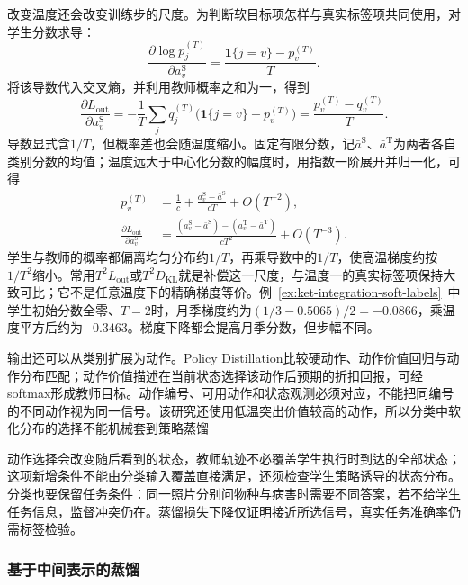 改变温度还会改变训练步的尺度。为判断软目标项怎样与真实标签项共同使用，对学生分数求导：
\[
  \frac{\partial\log p_j^{(T)}}{\partial a_v^{\mathrm{S}}}
    =\frac{\mathbf{1}\{j=v\}-p_v^{(T)}}{T}.
\]
将该导数代入交叉熵，并利用教师概率之和为一，得到
\begin{equation}
  \frac{\partial L_{\mathrm{out}}}{\partial a_v^{\mathrm{S}}}
   =-\frac{1}{T}\sum_jq_j^{(T)}
      \bigl(\mathbf{1}\{j=v\}-p_v^{(T)}\bigr)
   =\frac{p_v^{(T)}-q_v^{(T)}}{T}.
  \label{eq:ket-integration-temperature-gradient}
\end{equation}
导数显式含$1/T$，但概率差也会随温度缩小。固定有限分数，记$\bar a^{\mathrm{S}}$、$\bar a^{\mathrm{T}}$为两者各自类别分数的均值；温度远大于中心化分数的幅度时，用指数一阶展开并归一化，可得
\begin{equation}
  \begin{aligned}
    p_v^{(T)}
      &=\frac{1}{c}+\frac{a_v^{\mathrm{S}}-\bar a^{\mathrm{S}}}{cT}
          +O(T^{-2}),\\
    \frac{\partial L_{\mathrm{out}}}{\partial a_v^{\mathrm{S}}}
      &=\frac{(a_v^{\mathrm{S}}-\bar a^{\mathrm{S}})
              -(a_v^{\mathrm{T}}-\bar a^{\mathrm{T}})}
              {cT^2}+O(T^{-3}).
  \end{aligned}
  \label{eq:ket-integration-temperature-square}
\end{equation}
学生与教师的概率都偏离均匀分布约$1/T$，再乘导数中的$1/T$，使高温梯度约按$1/T^2$缩小。常用$T^2L_{\mathrm{out}}$或$T^2D_{\mathrm{KL}}$就是补偿这一尺度，与温度一的真实标签项保持大致可比；它不是任意温度下的精确梯度等价。例~\ref{ex:ket-integration-soft-labels}~中学生初始分数全零、$T=2$时，月季梯度约为$(1/3-0.5065)/2=-0.0866$，乘温度平方后约为$-0.3463$。梯度下降都会提高月季分数，但步幅不同。

输出还可以从类别扩展为动作。Policy Distillation比较硬动作、动作价值回归与动作分布匹配；动作价值描述在当前状态选择该动作后预期的折扣回报，可经softmax形成教师目标。动作编号、可用动作和状态观测必须对应，不能把同编号的不同动作视为同一信号。该研究还使用低温突出价值较高的动作，所以分类中软化分布的选择不能机械套到策略蒸馏

动作选择会改变随后看到的状态，教师轨迹不必覆盖学生执行时到达的全部状态；这项新增条件不能由分类输入覆盖直接满足，还须检查学生策略诱导的状态分布。分类也要保留任务条件：同一照片分别问物种与病害时需要不同答案，若不给学生任务信息，监督冲突仍在。蒸馏损失下降仅证明接近所选信号，真实任务准确率仍需标签检验。

\subsubsection{基于中间表示的蒸馏}
\label{sec:ket-integration-feature-distillation}


